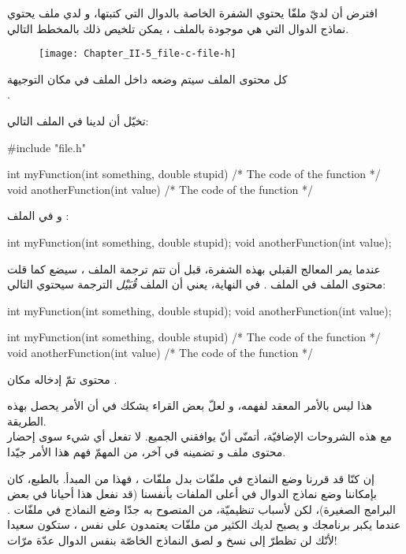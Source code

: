 افترض أن لديّ ملفّا
يحتوي الشفرة الخاصة بالدوال التي كتبتها، و لدي ملف
يحتوي نماذج الدوال التي هي موجودة بالملف
،
يمكن تلخيص ذلك بالمخطط التالي.

\begin{figure}[H]
	\centering
	\texttt{[image: Chapter\_II-5\_file-c-file-h]}
\end{figure}
كل محتوى الملف
سيتم وضعه داخل الملف
في مكان التوجيهة\\
.

تخيّل أن لدينا في الملف
التالي:

\begin{Csource}
#include "file.h"

int myFunction(int something, double stupid)
{
  /* The code of the function */
}
void anotherFunction(int value)
{
  /* The code of the function */
}
\end{Csource}

و في الملف
:

\begin{Csource}
int myFunction(int something, double stupid);
void anotherFunction(int value);
\end{Csource}

عندما يمر المعالج القبلي بهذه الشفرة، قبل أن تتم ترجمة الملف
،
سيضع كما قلت محتوى الملف
 في الملف
.
في النهاية، يعني أن الملف
\textit{قُبَيْل}
الترجمة سيحتوي التالي:

\begin{Csource}
int myFunction(int something, double stupid);
void anotherFunction(int value);

int myFunction(int something, double stupid)
{
  /* The code of the function */
}
void anotherFunction(int value)
{
  /* The code of the function */
}
\end{Csource}

محتوى
تمّ إدخاله مكان
.

هذا ليس بالأمر المعقد لفهمه، و لعلّ بعض القراء يشكك في أن الأمر يحصل بهذه الطريقة.\\
مع هذه الشروحات الإضافيّة، أتمنّى أنّ يوافقني الجميع.
لا تفعل أي شيء سوى إحضار محتوى ملف و تضمينه في آخر، من المهمّ فهم هذا الأمر جيّدا.

\begin{information}
  إن كنّا قد قررنا وضع النماذج في ملفّات
بدل ملفّات
،
فهذا من المبدأ.
بالطبع، كان بإمكاننا وضع نماذج الدوال في أعلى الملفات
بأنفسنا (قد نفعل هذا أحيانا في بعض البرامج الصغيرة)، لكن لأسباب تنظيميّة، من المنصوح به جدّا وضع النماذج في ملفّات
.
 عندما يكبر برنامجك و يصبح لديك الكثير من ملفّات
يعتمدون على نفس
،
ستكون سعيدا لأنّك لن تظطرّ إلى نسخ و لصق النماذج الخاصّة بنفس الدوال عدّة مرّات!
\end{information}


